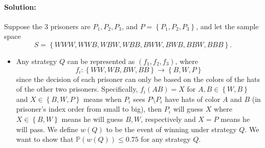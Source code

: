 \documentclass[a4paper,12pt]{article}
\newcommand{\mb}[1]{\mathbb{#1}}
\begin{document}
\paragraph{Solution:} Suppose the 3 prisoners are \(P_1, P_2, P_3\), and \(P = \left\{ P_1, P_2, P_3 \right\} \), and let the sample space
\[
	S = \left\{ WWW, WWB, WBW, WBB, BWW, BWB, BBW, BBB \right\}. 
\] 
\begin{itemize}
	\item [(a)] Any strategy \(Q\) can be represented as \((f_1, f_2, f_3)\), where 
	\[
		f_i: \left\{ WW, WB, BW, BB \right\} \to \left\{ B, W, P \right\}  
	\]
	since the decision of each prisoner can only be based on the colors of the hats of the other two prisoners. Specifically, \(f_i(AB) = X\) for \(A, B \in \left\{ W, B \right\} \) and \(X \in \left\{ B, W, P \right\} \) means when \(P_i\) sees \(P \setminus P_i\) have hats of color \(A\) and \(B\) (in prisoner's index order from small to big), then \(P_i\) will guess \(X\) where \(X \in \left\{ B, W \right\} \) means he will guess \(B, W\), respectively and \(X = P\) means he will pass. We define \(w(Q)\) to be the event of winning under strategy \(Q\). We want to show that \(\mb{P}(w(Q)) \leq 0.75\) for any strategy \(Q\).
	

\end{itemize}
\end{document}
